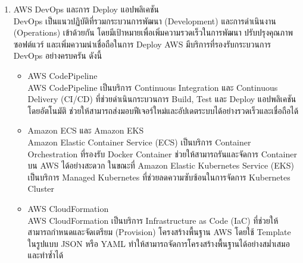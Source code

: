 \begin{itemize}
\begin{enumerate}
\begin{itemize}
    Amazon VPC ช่วยให้ผู้ใช้งานสามารถสร้างเครือข่ายเสมือนส่วนตัวที่แยกออกจากกันบน AWS Cloud โดยมีการควบคุม IP Address Range, Subnets, Route Tables และ Network Gateways อย่างครบถ้วน VPC ถือเป็นพื้นฐานสำคัญของการออกแบบ Network Architecture ที่มีความปลอดภัยบน AWS ส่วนประกอบสำคัญของ VPC ได้แก่ Public Subnet และ Private Subnet, Internet Gateway สำหรับการเชื่อมต่ออินเทอร์เน็ต, NAT Gateway สำหรับให้ Private Subnet เข้าถึงอินเทอร์เน็ต รวมถึง Security Groups และ Network Access Control Lists (NACLs) สำหรับควบคุมการเข้าถึงระบบ
    \item AWS IAM (Identity and Access Management) \\
    AWS IAM เป็นบริการจัดการสิทธิ์การเข้าถึงทรัพยากรบน AWS ช่วยให้สามารถกำหนดได้ว่าผู้ใช้งานหรือบริการใดสามารถเข้าถึงทรัพยากรใดได้บ้าง IAM ยึดหลัก Principle of Least Privilege ซึ่งหมายความว่าผู้ใช้งานหรือบริการจะได้รับสิทธิ์เฉพาะที่จำเป็นสำหรับการทำงานเท่านั้น IAM ประกอบด้วย Users, Groups, Roles และ Policies โดย Policies เขียนในรูปแบบ JSON เพื่อกำหนด Actions, Resources และ Conditions ที่อนุญาตหรือปฏิเสธการเข้าถึง
    \end{itemize}


       
        

        \item  AWS DevOps และการ Deploy แอปพลิเคชัน \\
        DevOps เป็นแนวปฏิบัติที่รวมกระบวนการพัฒนา (Development) และการดำเนินงาน (Operations) เข้าด้วยกัน โดยมีเป้าหมายเพื่อเพิ่มความรวดเร็วในการพัฒนา ปรับปรุงคุณภาพซอฟต์แวร์ และเพิ่มความน่าเชื่อถือในการ Deploy AWS มีบริการที่รองรับกระบวนการ DevOps อย่างครบครัน ดังนี้
  \begin{itemize}
    \item AWS CodePipeline\\
         AWS CodePipeline เป็นบริการ Continuous Integration และ Continuous Delivery (CI/CD) ที่ช่วยดำเนินกระบวนการ Build, Test และ Deploy แอปพลิเคชันโดยอัตโนมัติ ช่วยให้สามารถส่งมอบฟีเจอร์ใหม่และอัปเดตระบบได้อย่างรวดเร็วและเชื่อถือได้
    \item Amazon ECS และ Amazon EKS \\
        Amazon Elastic Container Service (ECS) เป็นบริการ Container Orchestration ที่รองรับ Docker Container ช่วยให้สามารถรันและจัดการ Container บน AWS ได้อย่างสะดวก ในขณะที่ Amazon Elastic Kubernetes Service (EKS) เป็นบริการ Managed Kubernetes ที่ช่วยลดความซับซ้อนในการจัดการ Kubernetes Cluster
    \item AWS CloudFormation \\
    AWS CloudFormation เป็นบริการ Infrastructure as Code (IaC) ที่ช่วยให้สามารถกำหนดและจัดเตรียม (Provision) โครงสร้างพื้นฐาน AWS โดยใช้ Template ในรูปแบบ JSON หรือ YAML ทำให้สามารถจัดการโครงสร้างพื้นฐานได้อย่างสม่ำเสมอและทำซ้ำได้
    \end{itemize}


\end{enumerate}
\end{itemize}
